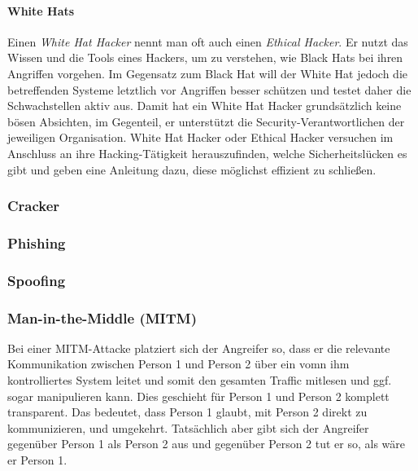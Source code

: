 \paragraph{White Hats} Einen \textit{White Hat Hacker} nennt man oft auch einen \textit{Ethical Hacker}. Er nutzt das Wissen und die Tools eines Hackers, um zu verstehen, wie Black Hats bei ihren Angriffen vorgehen. Im Gegensatz zum Black Hat will der White Hat jedoch die betreffenden Systeme letztlich vor Angriffen besser schützen und testet daher die Schwachstellen aktiv aus. Damit hat ein White Hat Hacker grundsätzlich keine bösen Absichten, im Gegenteil, er unterstützt die Security-Verantwortlichen der jeweiligen Organisation. White Hat Hacker oder Ethical Hacker versuchen im Anschluss an ihre Hacking-Tätigkeit herauszufinden, welche Sicherheitslücken es gibt und geben eine Anleitung dazu, diese möglichst effizient zu schließen.

\subsubsection{Cracker}
\label{sec:Cracker}


\subsubsection{Phishing}
\label{sec:Phishing}


\subsubsection{Spoofing}
\label{sec:Spoofing}


\subsubsection{Man-in-the-Middle (MITM)}
\label{sec:ManInTheMiddle}

Bei einer MITM-Attacke platziert sich der Angreifer so, dass er die relevante Kommunikation zwischen Person 1 und Person 2 über ein vomn ihm kontrolliertes System leitet und somit den gesamten Traffic mitlesen und ggf. sogar manipulieren kann. Dies geschieht für Person 1 und Person 2 komplett transparent. Das bedeutet, dass Person 1 glaubt, mit Person 2 direkt zu kommunizieren, und umgekehrt. Tatsächlich aber gibt sich der Angreifer gegenüber Person 1 als Person 2 aus und gegenüber Person 2 tut er so, als wäre er Person 1.


